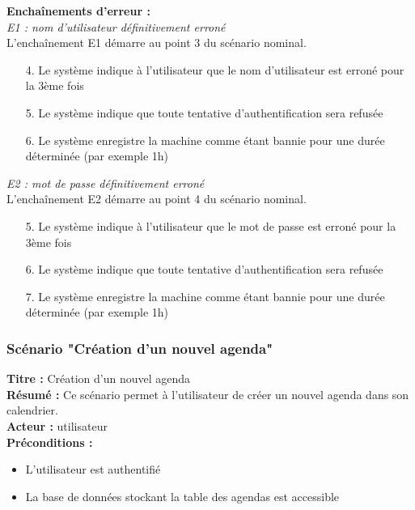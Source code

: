 \documentclass[12pt , a4paper]{article}
\begin{document}
\noindent\textbf{Encha\^inements d'erreur :}\\
\noindent\textit{E1 : nom d'utilisateur définitivement erroné}\\
L'encha\^inement E1 démarre au point 3 du scénario nominal.
\begin{enumerate}
\item[4.] Le système indique à l'utilisateur que le nom d'utilisateur est erroné pour la 3ème fois
\item[5.] Le système indique que toute tentative d'authentification sera refusée
\item[6.] Le système enregistre la machine comme étant bannie pour une durée déterminée (par exemple 1h)
\end{enumerate}


\noindent\textit{E2 : mot de passe définitivement erroné}\\
L'encha\^inement E2 démarre au point 4 du scénario nominal.
\begin{enumerate}
\item[5.] Le système indique à l'utilisateur que le mot de passe est erroné pour la 3ème fois
\item[6.] Le système indique que toute tentative d'authentification sera refusée
\item[7.] Le système enregistre la machine comme étant bannie pour une durée déterminée (par exemple 1h)
\end{enumerate}


\subsubsection{Scénario "Création d'un nouvel agenda"}

\noindent\textbf{Titre : } Création d’un nouvel agenda\\
\textbf{Résumé : } Ce scénario permet à l’utilisateur de créer un nouvel agenda dans son calendrier.\\
\textbf{Acteur : }utilisateur\\

\noindent\textbf{Préconditions :}
\begin{itemize}
\item L'utilisateur est authentifié
\item La base de données stockant la table des agendas est accessible\\
\end{itemize}
\end{document}
